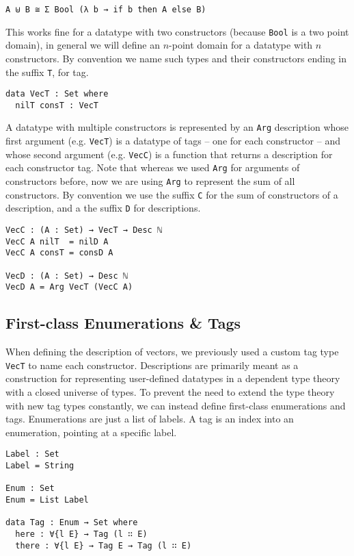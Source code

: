 \documentclass[preprint,nonatbib]{sigplanconf}
\begin{document}
\begin{verbatim}
A ⊎ B ≅ Σ Bool (λ b → if b then A else B)
\end{verbatim}

This works fine for a datatype with two constructors (because {\tt Bool} is a two point domain),
in general we will define an $n$-point domain for a datatype with $n$ constructors. By
convention we name such types and their constructors ending in the suffix {\tt T}, for tag.

\begin{verbatim}
data VecT : Set where
  nilT consT : VecT
\end{verbatim}

A datatype with multiple constructors is represented by an
{\tt Arg} description whose first argument (e.g. {\tt VecT}) is a datatype of tags
-- one for each constructor -- and whose second argument (e.g. {\tt VecC}) is
a function that returns a description for each constructor tag. Note
that whereas we used {\tt Arg} for arguments of constructors before,
now we are using {\tt Arg} to represent the sum of all constructors.
By convention we use the suffix {\tt C} for the sum of constructors of
a description, and a the suffix {\tt D} for descriptions.

\begin{verbatim}
VecC : (A : Set) → VecT → Desc ℕ
VecC A nilT  = nilD A
VecC A consT = consD A

VecD : (A : Set) → Desc ℕ
VecD A = Arg VecT (VecC A)
\end{verbatim}

\subsection{First-class Enumerations \& Tags}
\label{sec:background:case}

When defining the description of vectors, we previously used a custom
tag type {\tt VecT} to name each constructor. Descriptions are
primarily meant as a construction for representing user-defined
datatypes in a dependent type theory with a closed universe of types.
To prevent the need to extend the type theory with new tag types
constantly, we can instead define first-class enumerations and tags.
Enumerations are just a list of labels. A tag is an index into an
enumeration, pointing at a specific label.

\begin{verbatim}
Label : Set
Label = String

Enum : Set
Enum = List Label

data Tag : Enum → Set where
  here : ∀{l E} → Tag (l ∷ E)
  there : ∀{l E} → Tag E → Tag (l ∷ E)
\end{verbatim}
\end{document}
